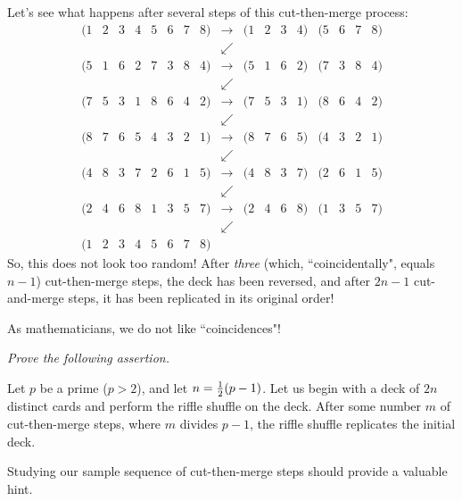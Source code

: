 \begin{enumerate}
\begin{enumerate}
Let's see what happens after several steps of this cut-then-merge process:
\[ \begin{array}{ccccccccccccccccc}
(1 & 2 & 3 & 4 & 5 & 6 & 7 & 8) & \rightarrow & (1 & 2 & 3 & 4) & (5 & 6 & 7 & 8) \\
 & & & & & & & & \swarrow & & & & & & & & \\
(5 & 1 & 6 & 2 & 7 & 3 & 8 & 4) & \rightarrow & (5 & 1 & 6 & 2) & (7 & 3 & 8 & 4) \\
 & & & & & & & & \swarrow & & & & & & & & \\
(7 & 5 & 3 & 1 & 8 & 6 & 4 & 2) &  \rightarrow& (7 & 5 & 3 & 1) & (8 & 6 & 4 & 2) \\
 & & & & & & & & \swarrow & & & & & & & & \\
(8 & 7 & 6 & 5 & 4 & 3 & 2 & 1) &  \rightarrow& (8 & 7 & 6 & 5) & (4 & 3 & 2 & 1) \\
 & & & & & & & & \swarrow & & & & & & & & \\
(4 & 8 & 3 & 7 & 2 & 6 & 1 & 5) &  \rightarrow& (4 & 8 & 3 & 7) & (2 & 6 & 1 & 5) \\
 & & & & & & & & \swarrow & & & & & & & & \\
(2 & 4 & 6 & 8 & 1 & 3 & 5 & 7) &  \rightarrow& (2 & 4 & 6 & 8) & (1 & 3 & 5 & 7) \\
 & & & & & & & & \swarrow & & & & & & & & \\
(1 & 2 & 3 & 4 & 5 & 6 & 7 & 8)
\end{array}
\]
So, this does not look too random!  After {\em three} (which, ``coincidentally", equals $n-1$) cut-then-merge steps, the deck has been reversed, and after $2n-1$ cut-and-merge steps, it has been replicated in its original order!

\smallskip

As mathematicians, we do not like ``coincidences"!

\medskip

{\em Prove the following assertion.}

\begin{prop}
Let $p$ be a prime ($p>2$), and let $n = {1 \over 2} (p-1)$.  Let us begin with a deck of $2n$ distinct cards and perform the riffle shuffle on the deck.  After some number $m$ of cut-then-merge steps, where $m$ divides $p-1$, the riffle shuffle replicates the initial deck.
\end{prop}

Studying our sample sequence of cut-then-merge steps should provide a valuable hint.

\medskip


\end{enumerate}
\end{enumerate}
